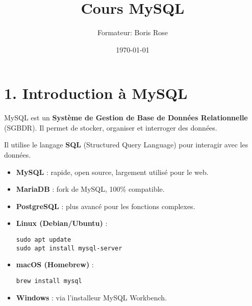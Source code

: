 \documentclass[a4paper,11pt]{article}
\title{Cours MySQL}
\author{Formateur: Boris Rose}
\date{\today}
\begin{document}
\maketitle

\section*{1. Introduction à MySQL}

\begin{tcolorbox}[colback=blue!5!white,colframe=blue!75!black,title=Qu'est-ce que MySQL ?]
MySQL est un \textbf{Système de Gestion de Base de Données Relationnelle} (SGBDR). 
Il permet de stocker, organiser et interroger des données. 

Il utilise le langage \textbf{SQL} (Structured Query Language) pour interagir avec les données.
\end{tcolorbox}

\begin{tcolorbox}[colback=green!5!white,colframe=green!75!black,title=Différences avec d'autres SGBD]
\begin{itemize}
    \item \textbf{MySQL} : rapide, open source, largement utilisé pour le web.
    \item \textbf{MariaDB} : fork de MySQL, 100\% compatible.
    \item \textbf{PostgreSQL} : plus avancé pour les fonctions complexes.
\end{itemize}
\end{tcolorbox}

\begin{tcolorbox}[colback=yellow!5!white,colframe=yellow!75!black,title=Installation]
\begin{itemize}
    \item \textbf{Linux (Debian/Ubuntu)} :
    \begin{verbatim}
sudo apt update
sudo apt install mysql-server
    \end{verbatim}

    \item \textbf{macOS (Homebrew)} :
    \begin{verbatim}
brew install mysql
    \end{verbatim}

    \item \textbf{Windows} : via l’installeur MySQL Workbench.
\end{itemize}
\end{tcolorbox}
\end{document}
